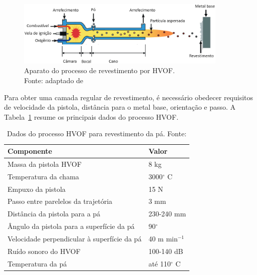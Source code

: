 \begin{figure}[h]
	\centering 
 	\includegraphics[width=0.90\textwidth]{figs/hvof_aparato}
 	\caption[Aparato do processo de revestimento por HVOF]{Aparato do processo de
 	revestimento por HVOF. \\ Fonte: adaptado de~\cite{kuroda2008warm}}
 	\label{fig::hvof_aparato}
\end{figure}

Para obter uma camada regular de revestimento, é necessário obedecer requisitos
de velocidade da pistola, distância para o metal base, orientação e passo. A
Tabela~\ref{tab::req_hvof} resume os principais dados do processo HVOF.

\begin{table}[h]
\centering
\caption[Dados do processo HVOF para revestimento da pá]{Dados do processo HVOF
para revestimento da pá. Fonte: \citet{freitas2017state}}
\label{tab::req_hvof}
\begin{tabular}{@{}ll@{}}
\toprule
\textbf{Componente}           							& \textbf{Valor}  		\\ \midrule
Massa da pistola HVOF        							& 8 kg           		\\
Temperatura da chama         							& 3000$^{\circ}$ C  	\\
Empuxo da pistola             							& 15 N           		\\
Passo entre parelelos da trajetória	   	    			& 3 mm  				\\
Distância da pistola para a pá 							& 230-240 mm 			\\
Ângulo da pistola para a superfície da pá				& 90$^{\circ}$      	\\
Velocidade perpendicular à superfície da pá  			& 40 m min$^{-1}$   	\\
Ruído sonoro do HVOF          							& 100-140 dB    		\\
Temperatura da pá              							& até 110$^{\circ}$ C 	\\ \bottomrule
\end{tabular}
\end{table}


